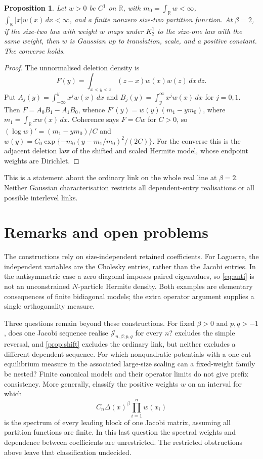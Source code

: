 \documentclass[10pt]{amsart}
\newtheorem{proposition}[theorem]{Proposition}
\newcommand{\R}{\mathbb R}
\newcommand{\Jac}{\mathcal J}
\begin{document}
\begin{proposition}\label{prop:gaussDA}
Let $w>0$ be $C^1$ on $\R$, with
$m_0=\int_\R w<\infty$, $\int_\R |x|w(x)\,dx<\infty$, and a
finite nonzero size-two partition function. At $\beta=2$, if the
size-two law with weight $w$ maps under $K_2^1$ to the size-one law
with the same weight, then $w$ is Gaussian up to translation,
scale, and a positive constant. The converse holds.
\end{proposition}
\begin{proof}
The unnormalised deletion density is
\[
 F(y)=\int_{x<y<z}(z-x)w(x)w(z)\,dx\,dz.
\]
Put $A_j(y)=\int_{-\infty}^y x^j w(x)\,dx$ and
$B_j(y)=\int_y^\infty x^j w(x)\,dx$ for $j=0,1$.
Then $F=A_0B_1-A_1B_0$, whence
$F'(y)=w(y)(m_1-ym_0)$, where $m_1=\int_\R xw(x)\,dx$.
Coherence says $F=Cw$ for $C>0$, so
$(\log w)'=(m_1-ym_0)/C$ and
$w(y)=C_0\exp\{-m_0(y-m_1/m_0)^2/(2C)\}$.
For the converse this is the adjacent deletion law of the shifted
and scaled Hermite model, whose endpoint weights are Dirichlet.
\end{proof}
This is a statement about the ordinary link on the whole real line
at $\beta=2$. Neither Gaussian characterisation restricts all
dependent-entry realisations or all possible interlevel links.

\section{Remarks and open problems}
The constructions rely on size-independent retained coefficients.
For Laguerre, the independent variables are the Cholesky entries,
rather than the Jacobi entries. In the antisymmetric case a zero
diagonal imposes paired eigenvalues, so \eqref{eq:anti} is not an
unconstrained $N$-particle Hermite density. Both examples are
elementary consequences of finite bidiagonal models; the extra
operator argument supplies a single orthogonality measure.

Three questions remain beyond these constructions. For fixed
$\beta>0$ and $p,q>-1$, does one Jacobi sequence realise
$\Jac_{n,\beta;p,q}$ for every $n$?  excludes the
simple reversal, and \cref{prop:shift} excludes the ordinary link,
but neither excludes a different dependent sequence.
For which nonquadratic potentials with a one-cut equilibrium
measure in the associated large-size scaling can a fixed-weight
family be nested? Finite canonical models and their operator
limits do not give prefix consistency. More generally, classify
the positive weights $w$ on an interval for which
\[
 C_n\Delta(x)^\beta\prod_{i=1}^n w(x_i)
\]
is the spectrum of every leading block of one Jacobi matrix,
assuming all partition functions are finite. In this last question
the spectral weights and dependence between coefficients are
unrestricted. The restricted obstructions above leave that
classification undecided.
\end{document}
